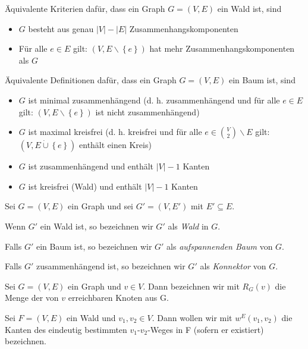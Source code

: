 \documentclass[10p,a4paper,BCOR = 12mm, DIV=15]{scrbook}
\begin{document}
\begin{Bem}
Äquivalente Kriterien dafür, dass ein Graph $G=(V, E)$ ein Wald ist, sind
\begin{itemize}
\item $G$ besteht aus genau $\left|V\right| - \left|E\right|$ Zusammenhangskomponenten
\item Für alle $e \in E$ gilt: $(V, E \backslash \left\{e\right\})$ hat mehr Zusammenhangskomponenten als $G$
\end{itemize}
Äquivalente Definitionen dafür, dass ein Graph $G=(V, E)$ ein Baum ist, sind
\begin{itemize}
\item $G$ ist minimal zusammenhängend (d. h. zusammenhängend und für alle $e\in E$ gilt: \linebreak $(V, E \backslash \left\{e\right\})$ ist nicht zusammenhängend)
\item $G$ ist maximal kreisfrei (d. h. kreisfrei und für alle $e\in {V \choose 2} \backslash E$ gilt: $(V, E \mathbin{\dot{\cup}} \left\{e\right\})$ enthält einen Kreis)
\item $G$ ist zusammenhängend und enthält $\left|V\right|-1$ Kanten
\item $G$ ist kreisfrei (Wald) und enthält $\left|V\right|-1$ Kanten
\end{itemize}
\end{Bem}

\begin{Def}
Sei $G=\left(V, E\right)$ ein Graph und sei $G'=\left(V, E'\right)$ mit $E' \subseteq E$.

Wenn $G'$ ein Wald ist, so bezeichnen wir $G'$ als \emph{Wald} in $G$.

Falls $G'$ ein Baum ist, so bezeichnen wir $G'$ als \emph{aufspannenden Baum} von $G$.

Falls $G'$ zusammenhängend ist, so bezeichnen wir $G'$ als \emph{Konnektor} von $G$.
\end{Def}

\begin{Def}
\label{def:erreichbar_weg}
Sei $G=(V, E)$ ein Graph und $v\in V$. Dann bezeichnen wir mit $R_G(v)$ die Menge der von $v$ erreichbaren Knoten aus G.
\end{Def}

\begin{Def}
\label{def:kanten_weg}
Sei $F=(V, E)$ ein Wald und $v_1, v_2 \in V$. Dann wollen wir mit $w^E\left(v_1, v_2\right)$ die Kanten des eindeutig bestimmten $v_1$-$v_2$-Weges in F (sofern er existiert) bezeichnen.
\end{Def}
\end{document}
